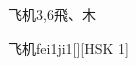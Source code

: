 \begin{entry}{飞机}{3,6}{⾶、⽊}
  \begin{phonetics}{飞机}{fei1ji1}[][HSK 1]
  \end{phonetics}
\end{entry}
